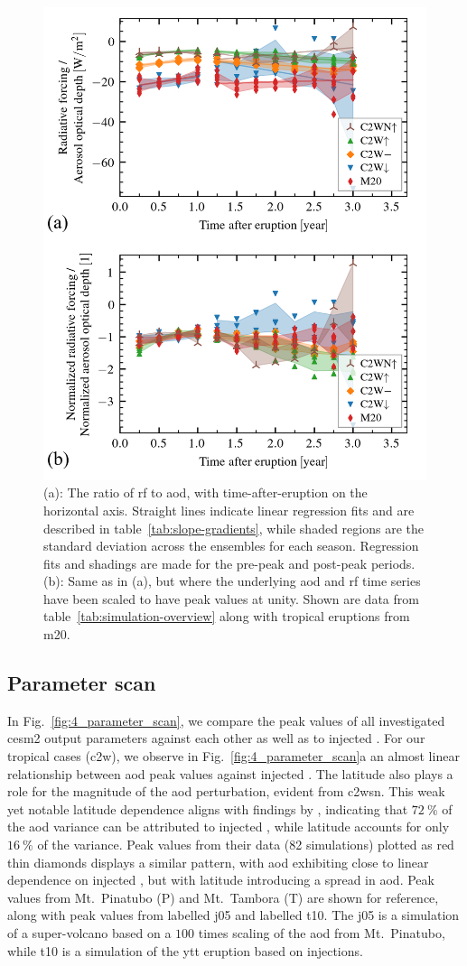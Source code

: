 \documentclass{ametsocV6.1}
\newcommand{\iso}[1][i]{{#1}njected \ce{SO2}}
\begin{document}
\begin{figure}
  \centering
  \includegraphics[width=0.5\linewidth]{figures/figure3.png}

  \caption{(a): The ratio of \gls{rf} to \gls{aod}, with time-after-eruption on the
    horizontal axis. Straight lines indicate linear regression fits and are described in
    table~\ref{tab:slope-gradients}, while shaded regions are the standard deviation across
    the ensembles for each season. Regression fits and shadings are made for the pre-peak
    and post-peak periods. (b): Same as in (a), but where the underlying \gls{aod} and
    \gls{rf} time series have been scaled to have peak values at unity. Shown are data from
    table~\ref{tab:simulation-overview} along with tropical eruptions from
    \gls{m20}.}\label{fig:3_rf_to_aod_ratios}%
\end{figure}

\subsection{Parameter scan}

In Fig.~\ref{fig:4_parameter_scan}, we compare the peak values of all investigated
\gls{cesm2} output parameters against each other as well as to \iso{}. For our tropical
cases (\gls{c2w}), we observe in Fig.~\ref{fig:4_parameter_scan}a an almost linear
relationship between \gls{aod} peak values against \iso{}. The latitude also plays a
role for the magnitude of the \gls{aod} perturbation, evident from \gls{c2wsn}. This
weak yet notable latitude dependence aligns with findings by \citet{marshall2019},
indicating that \(\SI{72}{\percent}\) of the \gls{aod} variance can be attributed to
\iso{}, while latitude accounts for only \(\SI{16}{\percent}\) of the variance. Peak
values from their data (82 simulations) plotted as red thin diamonds displays a similar
pattern, with \gls{aod} exhibiting close to linear dependence on \iso{}, but with
latitude introducing a spread in \gls{aod}. Peak values from Mt.\ Pinatubo (P) and Mt.\
Tambora (T) are shown for reference, along with peak values from \citet{jones2005}
labelled \gls{j05} and \citet{timmreck2010} labelled \gls{t10}. The \gls{j05} is a
simulation of a super-volcano based on a \(100\) times scaling of the \gls{aod} from
Mt.\ Pinatubo, while \gls{t10} is a simulation of the \gls{ytt} eruption based on
\ce{SO2} injections.
\end{document}

